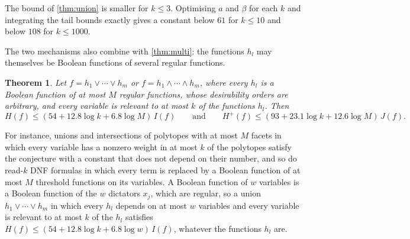 \documentclass[11pt]{amsart}
\newtheorem{theorem}{Theorem}[section]
\theoremstyle{definition}
\theoremstyle{remark}
\begin{document}
The bound of \cref{thm:union} is smaller for $k\le3$. Optimising $a$ and $\beta$ for each $k$ and integrating the tail
bounds exactly gives a constant below $61$ for $k\le10$ and below $108$ for $k\le1000$.

The two mechanisms also combine with \cref{thm:multi}: the functions $h_l$ may themselves be Boolean functions of
several regular functions.

\begin{theorem}\label{thm:union-multi}
Let $f=h_1\vee\cdots\vee h_m$ or $f=h_1\wedge\cdots\wedge h_m$, where every $h_l$ is a Boolean function of at most $M$
regular functions, whose desirability orders are arbitrary, and every variable is relevant to at most $k$ of the
functions $h_l$. Then
\[
H(f)\le(54+12.8\log k+6.8\log M)\,I(f)\qquad\text{and}\qquad H^+(f)\le(93+23.1\log k+12.6\log M)\,J(f).
\]
\end{theorem}

For instance, unions and intersections of polytopes with at most $M$ facets in which every variable has a nonzero
weight in at most $k$ of the polytopes satisfy the conjecture with a constant that does not depend on their number,
and so do read-$k$ DNF formulas in which every term is replaced by a Boolean function of at most $M$ threshold
functions on its variables. A Boolean function of $w$ variables is a Boolean function of the $w$ dictators $x_j$,
which are regular, so a union $h_1\vee\cdots\vee h_m$ in which every $h_l$ depends on at most $w$ variables and every
variable is relevant to at most $k$ of the $h_l$ satisfies $H(f)\le(54+12.8\log k+6.8\log w)\,I(f)$, whatever the
functions $h_l$ are.
\end{document}
